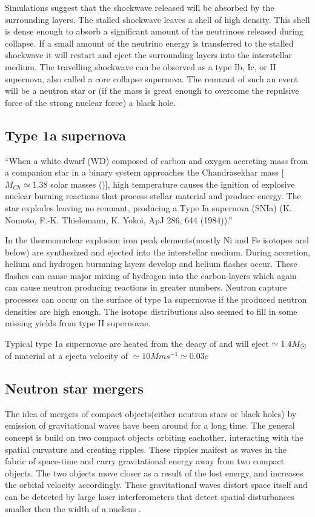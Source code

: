 Simulations suggest that the shockwave released will be absorbed by the surrounding layers. The stalled shockwave leaves a shell of high density. This shell is dense enough to absorb a significant amount of the neutrinoes released during collapse. If a small amount of the neutrino energy is transferred to the stalled shockwave it will restart and eject the surrounding layers into the interstellar medium.
The travelling shockwave can be observed as a type Ib, Ic, or II supernova, also called a core collapse supernova. The remnant of such an event will be a neutron star or (if the mass is great enough to overcome the repulsive force of the strong nuclear force) a black hole.

\subsection{Type 1a supernova}
``When a white dwarf (WD) composed of carbon and oxygen accreting mass from a companion star in
a binary system approaches the Chandrasekhar mass [$M_{Ch} \simeq 1.38$ solar masses (\msol)], high temperature
causes the ignition of explosive nuclear burning reactions that process stellar material and produce energy.
The star explodes leaving no remnant, producing a Type Ia supernova (SNIa) (K. Nomoto, F.-K. Thielemann, K. Yokoi, ApJ 286, 644 (1984)).''

In the thermonuclear explosion iron peak elements(mostly Ni and Fe isotopes and below) are synthesized and ejected into the interstellar medium. During accretion, helium and hydrogen burmning layers develop and helium flashes occur. These flashes can cause major mixing of hydrogen into the carbon-layers which again can cause neutron producing reactions in greater numbers. Neutron capture processes can occur on the surface of type 1a supernovae if the produced neutron densities are high enough. The isotope distributions also seemed to fill in some missing yields from type II supernovae.

Typical type 1a supernovae are heated from the deacy of  and will eject $\simeq 1.4 \msol$ of material at a ejecta velocity of $\simeq10 Mm s^{-1} \simeq 0.03c$ 

\subsection{Neutron star mergers}
The idea of mergers of compact objects(either neutron stars or black holes) by emission of gravitational waves have been around for a long time. The general concept is build on two compact objects orbiting eachother, interacting with the spatial curvature and creating ripples. These ripples maifest as waves in the fabric of space-time and carry gravitational energy away from two compact objects. The two objects move closer as a result of the lost energy, and increases the orbital velocity accordingly.
These gravitational waves distort space itself and can be detected by large laser interferometers that detect spatial disturbances smaller then the width of a nucleus .

